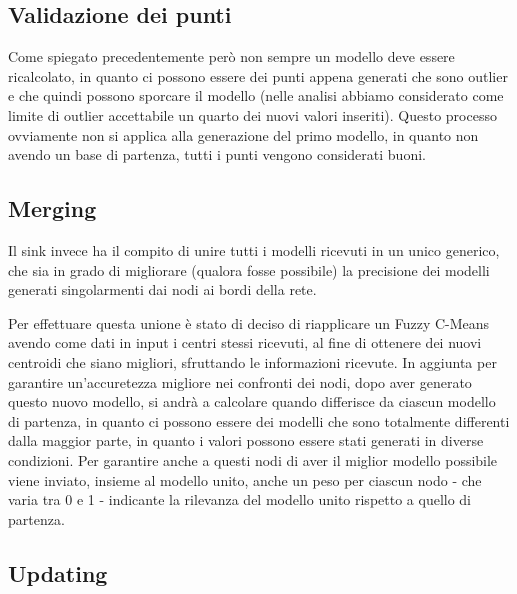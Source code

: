 
\subsection{Validazione dei punti}
Come spiegato precedentemente però non sempre un modello deve essere ricalcolato, in quanto ci possono essere dei punti appena generati che sono outlier e che quindi possono sporcare il modello (nelle analisi abbiamo considerato come limite di outlier accettabile un quarto dei nuovi valori inseriti).
Questo processo ovviamente non si applica alla generazione del primo modello, in quanto non avendo un base di partenza, tutti i punti vengono considerati buoni.



\subsection{Merging}

Il sink invece ha il compito di unire tutti i modelli ricevuti in un unico generico, che sia in grado di migliorare (qualora fosse possibile) la precisione dei modelli generati singolarmenti dai nodi ai bordi della rete.

Per effettuare questa unione è stato di deciso di riapplicare un Fuzzy C-Means avendo come dati in input i centri stessi ricevuti, al fine di ottenere dei nuovi centroidi che siano migliori, sfruttando le informazioni ricevute. In aggiunta per garantire un'accuretezza migliore nei confronti dei nodi, dopo aver generato questo nuovo modello, si andrà a calcolare quando differisce da ciascun modello di partenza, in quanto ci possono essere dei modelli che sono totalmente differenti dalla maggior parte, in quanto i valori possono essere stati generati in diverse condizioni. Per garantire anche a questi nodi di aver il miglior modello possibile viene inviato, insieme al modello unito, anche un peso per ciascun nodo - che varia tra 0 e 1 - indicante la rilevanza del modello unito rispetto a quello di partenza.



\subsection{Updating}

